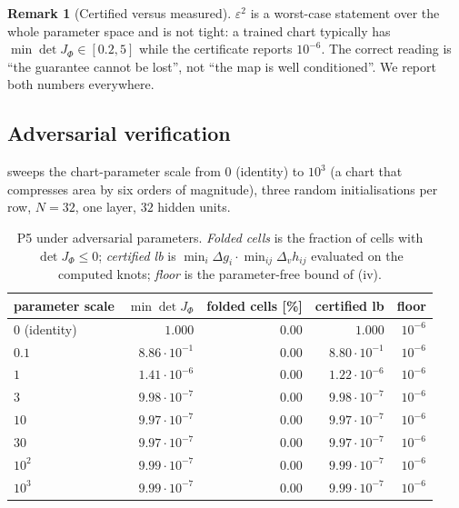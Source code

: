 \documentclass[11pt,a4paper]{article}
\theoremstyle{plain}
\theoremstyle{definition}
\newtheorem{remark}[theorem]{Remark}
\newcommand{\detJ}{\det J_\Phi}
\begin{document}
\begin{remark}[Certified versus measured]
$\varepsilon^2$ is a worst-case statement over the whole parameter space and is
not tight: a trained chart typically has $\min\detJ\in[0.2,5]$ while the
certificate reports $10^{-6}$.  The correct reading is ``the guarantee cannot be
lost'', not ``the map is well conditioned''.  We report both numbers everywhere.
\end{remark}

\subsection{Adversarial verification}

 sweeps the chart-parameter scale from $0$ (identity) to
$10^{3}$ (a chart that compresses area by six orders of magnitude), three
random initialisations per row, $N=32$, one layer, $32$ hidden units.

\begin{table}[t]
\centering
\caption{P5 under adversarial parameters.  \emph{Folded cells} is the fraction of
cells with $\detJ\le0$; \emph{certified lb} is
$\min_i\Delta g_i\cdot\min_{ij}\Delta_v h_{ij}$ evaluated on the computed knots;
\emph{floor} is the parameter-free bound of (iv).}
\label{tab:certificate}
\begin{tabular}{lrrrr}
\toprule
parameter scale & $\min\detJ$ & folded cells [\%] & certified lb & floor \\
\midrule
0 (identity)      & $1.000$            & $0.00$ & $1.000$            & $10^{-6}$\\
$0.1$             & $8.86\cdot10^{-1}$ & $0.00$ & $8.80\cdot10^{-1}$ & $10^{-6}$\\
$1$               & $1.41\cdot10^{-6}$ & $0.00$ & $1.22\cdot10^{-6}$ & $10^{-6}$\\
$3$               & $9.98\cdot10^{-7}$ & $0.00$ & $9.98\cdot10^{-7}$ & $10^{-6}$\\
$10$              & $9.97\cdot10^{-7}$ & $0.00$ & $9.97\cdot10^{-7}$ & $10^{-6}$\\
$30$              & $9.97\cdot10^{-7}$ & $0.00$ & $9.97\cdot10^{-7}$ & $10^{-6}$\\
$10^{2}$          & $9.99\cdot10^{-7}$ & $0.00$ & $9.99\cdot10^{-7}$ & $10^{-6}$\\
$10^{3}$          & $9.99\cdot10^{-7}$ & $0.00$ & $9.99\cdot10^{-7}$ & $10^{-6}$\\
\bottomrule
\end{tabular}
\end{table}
\end{document}
